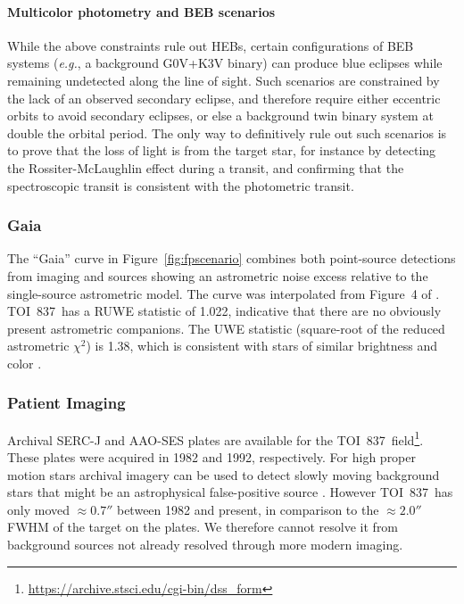 \documentclass[12pt,twocolumn,tighten]{aastex63}
\newcommand{\tn}{TOI~837} %
\begin{document}
\paragraph{Multicolor photometry and BEB scenarios}

While the above constraints rule out HEBs, certain configurations of
BEB systems ({\it e.g.}, a background G0V+K3V binary) can produce blue
eclipses while remaining undetected along the line of sight.  Such
scenarios are constrained by the lack of an observed secondary
eclipse, and therefore require either eccentric orbits to avoid
secondary eclipses, or else a background twin binary system at double
the orbital period.  The only way to definitively rule out such
scenarios is to prove that the loss of light is from the target star,
for instance by detecting the Rossiter-McLaughlin effect during a
transit, and confirming that the spectroscopic transit is consistent
with the photometric transit.


\subsubsection{Gaia}

The ``Gaia'' curve in Figure~\ref{fig:fpscenario} combines both
point-source detections from imaging and sources showing an
astrometric noise excess relative to the single-source astrometric
model.  The curve was interpolated from Figure~4 of
\citet{rizzuto_zeitVIII_2018}.  \tn\ has a RUWE statistic of 1.022,
indicative that there are no obviously present astrometric companions.
The UWE statistic (square-root of the reduced astrometric $\chi^2$) is
1.38, which is consistent with stars of similar brightness and color
\citep[][Appendix A]{lindegren_gaiasoln_2018}.


\subsubsection{Patient Imaging}

Archival SERC-J and AAO-SES plates are available for the \tn\
field\footnote{\url{https://archive.stsci.edu/cgi-bin/dss_form}}.
These plates were acquired in 1982 and 1992, respectively.  For high
proper motion stars archival imagery can be used to detect slowly
moving background stars that might be an astrophysical false-positive
source \citep[{\it
e.g.},][]{bakos_stellar_2006,huang_pimen_2018,vanderburg_hr858_2019}.
However \tn\ has only moved $\approx0.7''$ between 1982 and present,
in comparison to the $\approx2.0''$ FWHM of the target on the plates.
We therefore cannot resolve it from background sources not already
resolved through more modern imaging.
\end{document}

